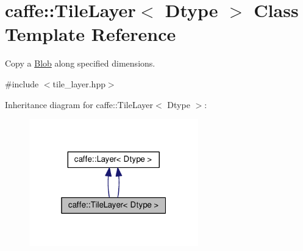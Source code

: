 \hypertarget{classcaffe_1_1_tile_layer}{}\section{caffe\+:\+:Tile\+Layer$<$ Dtype $>$ Class Template Reference}
\label{classcaffe_1_1_tile_layer}


Copy a \mbox{\hyperlink{classcaffe_1_1_blob}{Blob}} along specified dimensions.  




{\ttfamily \#include $<$tile\+\_\+layer.\+hpp$>$}



Inheritance diagram for caffe\+:\+:Tile\+Layer$<$ Dtype $>$\+:
\nopagebreak
\begin{figure}[H]
\begin{center}
\leavevmode
\includegraphics[width=208pt]{classcaffe_1_1_tile_layer__inherit__graph}
\end{center}
\end{figure}
